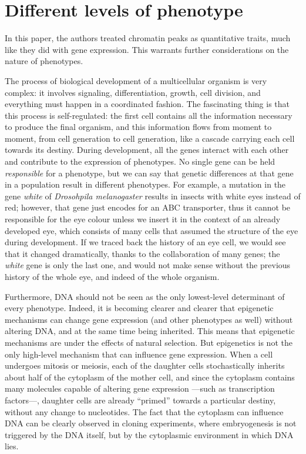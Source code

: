 \documentclass[../main.tex]{subfiles}
\begin{document}
\section{Different levels of phenotype}

In this paper, the authors treated chromatin peaks as quantitative 
traits, much like they did with gene expression. This warrants further 
considerations on the nature of phenotypes.

The process of biological development of a multicellular organism is 
very complex: it involves signaling, differentiation, growth, cell 
division, and everything must happen in a coordinated fashion. The 
fascinating thing is that this process is self-regulated: the first cell 
contains all the information necessary to produce the final organism, 
and this information flows from moment to moment, from cell generation 
to cell generation, like a cascade carrying each cell towards its 
destiny. During development, all the genes interact with each other and 
contribute to the expression of phenotypes. No single gene can be held 
\textit{responsible} for a phenotype, but we can say that genetic 
differences at that gene in a population result in different 
phenotypes\autocite{Griffiths2000}. For example, a mutation in the gene 
\textit{white} of \textit{Drosohpila melanogaster} results in insects 
with white eyes instead of red; however, that gene just encodes for an 
ABC transporter\autocite{Mackenzie1999}, thus it cannot be responsible for 
the eye colour unless we insert it in the context of an already 
developed eye, which consists of many cells that assumed the structure 
of the eye during development. If we traced back the history of an eye 
cell, we would see that it changed dramatically, thanks to the 
collaboration of many genes; the \textit{white} gene is only the last 
one, and would not make sense without the previous history of the whole 
eye, and indeed of the whole organism.

Furthermore, DNA should not be seen as the only lowest-level determinant 
of every phenotype. Indeed, it is becoming clearer and clearer that 
epigenetic mechanisms can change gene expression (and other phenotypes 
as well) without altering DNA, and at the same time being inherited. 
This means that epigenetic mechanisms are under the effects of natural 
selection\autocite{Hunter2009}. But epigenetics is not the only high-level 
mechanism that can influence gene expression. When a cell undergoes 
mitosis or meiosis, each of the daughter cells stochastically inherits 
about half of the cytoplasm of the mother cell, and since the cytoplasm 
contains many molecules capable of altering gene expression ---such as 
transcription factors---, daughter cells are already \enquote{primed} 
towards a particular destiny, without any change to nucleotides. The 
fact that the cytoplasm can influence DNA can be clearly observed in 
cloning experiments, where embryogenesis is not triggered by the DNA 
itself, but by the cytoplasmic environment in which DNA lies.
\end{document}
